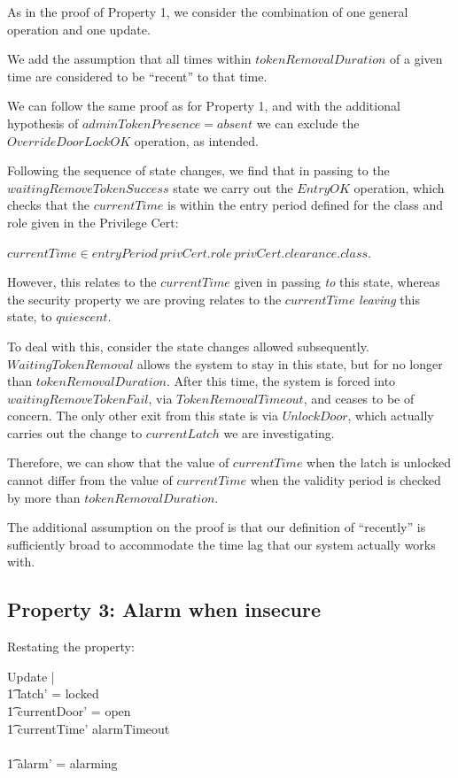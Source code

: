 As in the proof of Property 1,
we consider the combination of one general operation and one update.

We add the assumption that all times within $tokenRemovalDuration$ of a given
time are considered to be ``recent'' to that time.

We can follow the same proof as for Property 1,
and with the additional hypothesis of $adminTokenPresence = absent$
we can exclude the $OverrideDoorLockOK$ operation,
as intended.

Following the sequence of state changes,
we find that in passing to the $waitingRemoveTokenSuccess$ state
we carry out the $EntryOK$ operation,
which checks that the $currentTime$ is within the entry period defined
for the class and role given in the Privilege Cert:

$currentTime \in entryPeriod~privCert.role~privCert.clearance.class$.

However, this relates to the $currentTime$ given in passing {\em to}
this state, 
whereas the security property we are proving relates to the $currentTime$
{\em leaving} this state, to $quiescent$.

To deal with this, consider the state changes allowed subsequently.
$WaitingTokenRemoval$ allows the system to stay in this state,
but for no longer than $tokenRemovalDuration$. 
After this time, the system is forced into $waitingRemoveTokenFail$,
via $TokenRemovalTimeout$,
and ceases to be of concern.
The only other exit from this state is via $UnlockDoor$,
which actually carries out the change to $currentLatch$ we are investigating.

Therefore, we can show that the value of $currentTime$ when the latch is
unlocked cannot differ from the value of $currentTime$ when the validity
period is checked by more than $tokenRemovalDuration$.

The additional assumption on the proof is that our definition of ``recently''
is sufficiently broad to accommodate the time lag that our system
actually works with.

\subsection{Property 3: Alarm when insecure}
\label{sec:AlarmArg}
Restating the property:

\begin{zed}
Update |
\\ \t1	latch' = locked 
\\ \t1	\land currentDoor' = open
\\ \t1	\land currentTime' \geq alarmTimeout
\\ \shows
\\ \t1	alarm' = alarming
\end{zed}

